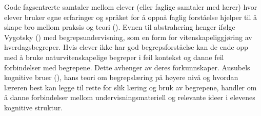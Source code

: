 \documentclass[main.tex]{subfiles}
\begin{document}
Gode fagsentrerte samtaler mellom elever (eller faglige samtaler med lærer) hvor elever bruker egne 
erfaringer og språket for å oppnå faglig forståelse hjelper til å skape bro mellom praksis og teori 
().
\newline
\newline
Evnen til abstrahering henger ifølge Vygotsky () med begrepsundervisning, som en
form for vitenskapeliggjøring av hverdagsbegreper. Hvis elever ikke har god begrepsforståelse
kan de ende opp med å bruke naturvitenskapelige begreper i feil kontekst og danne feil 
forbindelser med begrepene. Dette avhenger av deres forkunnskaper. Ausubels kognitive bruer 
(), hans teori om begrepslæring på høyere nivå og hvordan læreren best kan 
legge til rette for slik læring og bruk av begrepene,  handler om å danne forbindelser mellom 
undervisningsmateriell og relevante ideer i elevenes kognitive struktur.


\end{document}
